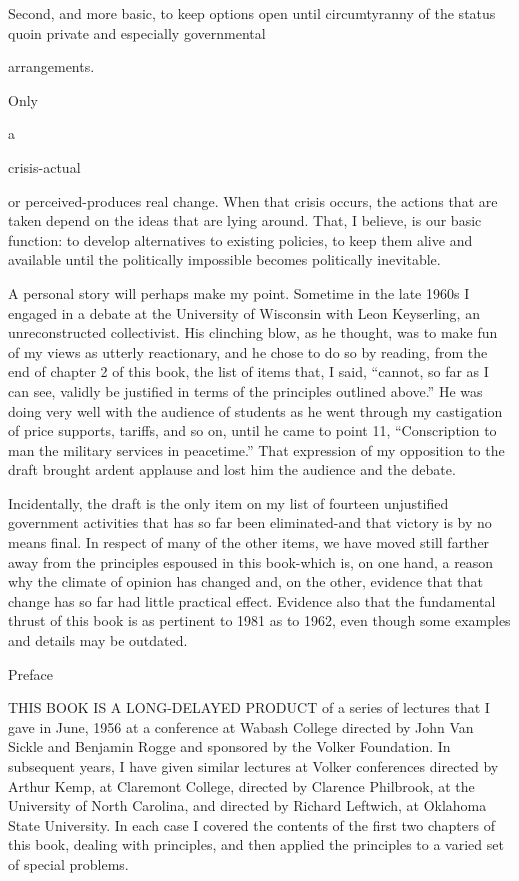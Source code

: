 \documentclass[11pt,openany]{book}
\begin{document}
Second, and more basic, to keep options open until circumtyranny of the status quoin private and especially governmental

arrangements.

Only

a

crisis-actual

or perceived-produces real change. When that crisis occurs, the actions that are taken depend on the ideas that are lying around. That, I believe, is our basic function: to develop alternatives to existing policies, to keep them alive and available until the politically impossible becomes politically inevitable.

A personal story will perhaps make my point. Sometime in the late 1960s I engaged in a debate at the University of Wisconsin with Leon Keyserling, an unreconstructed collectivist. His clinching blow, as he thought, was to make fun of my views as utterly reactionary, and he chose to do so by reading, from the end of chapter 2 of this book, the list of items that, I said, ``cannot, so far as I can see, validly be justified in terms of the principles outlined above.'' He was doing very well with the audience of students as he went through my castigation of price supports, tariffs, and so on, until he came to point 11, ``Conscription to man the military services in peacetime.'' That expression of my opposition to the draft brought ardent applause and lost him the audience and the debate.

Incidentally, the draft is the only item on my list of fourteen unjustified government activities that has so far been eliminated-and that victory is by no means final. In respect of many of the other items, we have moved still farther away from the principles espoused in this book-which is, on one hand, a reason why the climate of opinion has changed and, on the other, evidence that that change has so far had little practical effect. Evidence also that the fundamental thrust of this book is as pertinent to 1981 as to 1962, even though some examples and details may be outdated.

Preface

THIS BOOK IS A LONG-DELAYED PRODUCT of a series of lectures that I gave in June, 1956 at a conference at Wabash College directed by John Van Sickle and Benjamin Rogge and sponsored by the Volker Foundation. In subsequent years, I have given similar lectures at Volker conferences directed by Arthur Kemp, at Claremont College, directed by Clarence Philbrook, at the University of North Carolina, and directed by Richard Leftwich, at Oklahoma State University. In each case I covered the contents of the first two chapters of this book, dealing with principles, and then applied the principles to a varied set of special problems.
\end{document}

